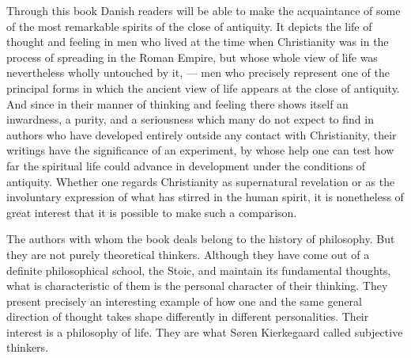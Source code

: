 \documentclass[12pt,a4paper,openany]{book}
\newcommand{\opage}[1]{\marginnote{\footnotesize\textit{[#1]}}}
\begin{document}
Through this book Danish readers will be able to make the
acquaintance of some of the most remarkable spirits of the close of antiquity.
It depicts the life of thought and feeling in men
who lived at the time when Christianity was in the process
of spreading in the Roman Empire, but whose whole view of life
was nevertheless wholly untouched by it, --- men who precisely
represent one of the principal forms in which the ancient view of life
appears at the close of antiquity. And since in their manner
of thinking and feeling there shows itself an inwardness, a purity, and
a seriousness which many do not expect to find in authors who
have developed entirely outside any contact with Christianity,
their writings have the significance of an experiment, by whose
help one can test how far the spiritual life could
advance in development under the conditions of antiquity. Whether one
regards Christianity as supernatural revelation or
as the involuntary expression of what has stirred in
the human spirit, it is nonetheless of great interest that it is possible to
make such a comparison.

The authors with whom the book deals belong
to the history of philosophy. But they are not purely theoretical thinkers.
Although they have come out of a definite philosophical school, the
Stoic, and maintain its fundamental thoughts, what is characteristic
of them is the personal character of their thinking. They present
precisely an interesting example of how one and the same
general direction of thought takes shape differently in
\opage{159}different personalities. Their interest is a philosophy of life. They
are what Søren Kierkegaard called subjective thinkers.
\end{document}
